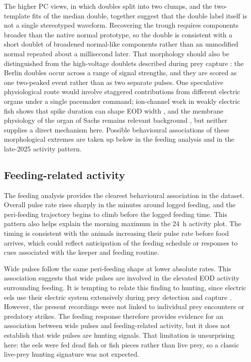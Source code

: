 The higher PC views, in which doubles split into two clumps, and the two-template fits of the median double, together suggest that the double label itself is not a single stereotyped waveform.
Recovering the trough requires components broader than the native normal prototype, so the double is consistent with a short doublet of broadened normal-like components rather than an unmodified normal repeated about a millisecond later.
That morphology should also be distinguished from the high-voltage doublets described during prey capture \parencite{catania2014shocking}: the Berlin doubles occur across a range of signal strengths, and they are scored as one two-peaked event rather than as two separate pulses.
One speculative physiological route would involve staggered contributions from different electric organs under a single pacemaker command; ion-channel work in weakly electric fish shows that spike duration can shape EOD width \textcite{mcanelly2000coregulation}, and the membrane physiology of the organ of Sachs remains relevant background \parencite{keynes1953membrane}, but neither supplies a direct mechanism here.
Possible behavioural associations of these morphological extremes are taken up below in the feeding analysis and in the late-2025 activity pattern.

\subsection{Feeding-related activity}

The feeding analysis provides the clearest behavioural association in the dataset. 
Overall pulse rate rises sharply in the minutes around logged feeding, and the peri-feeding trajectory begins to climb before the logged feeding time.
This pattern also helps explain the morning maximum in the 24~h activity plot. 
The timing is consistent with the animals increasing their pulse rate before food arrives, which could reflect anticipation of the feeding schedule or responses to cues associated with the keeper and feeding routine.

Wide pulses follow the same peri-feeding shape at lower absolute rates.
This association suggests that wide pulses are involved in the elevated EOD activity surrounding feeding. 
It is tempting to relate this finding to hunting, since electric eels use their electric system extensively during prey detection and capture \parencite{catania2014shocking, catania2015highvoltage, catania2015electric, catania2019astonishing}. 
However, the present recordings were not linked to individual prey encounters or predatory strikes. 
The feeding response therefore provides evidence for an association between wide pulses and feeding-related activity, but it does not establish that wide pulses are hunting signals.
That limitation is unsurprising here: the eels were fed dead fish or fish pieces rather than live prey, so a classic live-prey hunting signature was not expected.

